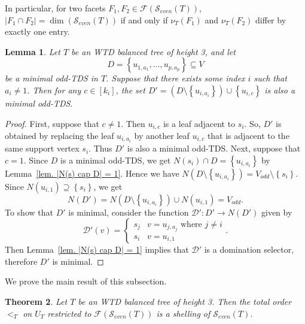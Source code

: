 \documentclass[12pt, reqno]{amsart}
\theoremstyle{definition}
\theoremstyle{plain}
\newtheorem{theorem}{Theorem}[subsection]
\newtheorem{lemma}[theorem]{Lemma}
\theoremstyle{definition}
\newcommand\set[1]{\left\lbrace #1 \right\rbrace}
\newcommand{\calS}{\mathcal{S}}
\newcommand{\calF}{\mathcal{F}}
\begin{document}
In particular, for two facets $F_1,F_2 \in \calF(\calS_{even}(T))$, $|F_1 \cap F_2| = \dim(\calS_{even}(T))$ if and only if $\nu_T(F_1)$ and $\nu_T(F_2)$ differ by exactly one entry.

\begin{lemma}\label{lem. non-zero to 1 is TDS}
    Let $T$ be an WTD balanced tree of height 3, and let 
    $$
    D = \set{u_{1,a_1},\dots,u_{p,a_p}} \subseteq V
    $$ 
    be a minimal odd-TDS in $T$.
    Suppose that there exists some index $i$ such that $a_i \neq 1$.
    Then for any $c \in [k_i]$, the set
    $D' = (D\setminus \set{u_{i,a_i}}) \cup \set{u_{i,c}}$
    is also a minimal odd-TDS.
\end{lemma}

\begin{proof}
    First, suppose that $c \neq 1$. 
    Then $u_{i,c}$ is a leaf adjacent to $s_i$.
    So, $D'$ is obtained by replacing the leaf $u_{i,a_i}$ by another leaf $u_{i,c}$ that is adjacent to the same support vertex $s_i$. 
    Thus $D'$ is also a minimal odd-TDS.
    Next, suppose that $c = 1$.
    Since $D$ is a minimal odd-TDS, we get $N(s_i) \cap D = \set{u_{i,a_i}}$ by Lemma~\ref{lem. |N(s) cap D| = 1}. 
    Hence we have $N(D\setminus \set{u_{i,a_i}}) = V_{odd}\setminus \set{s_i}$.
    Since $N(u_{i,1}) \supseteq \set{s_i}$, we get
    $$
    N(D') = N(D\setminus \set{u_{i,a_i}}) \cup N(u_{i,1}) = V_{odd}.
    $$ 
    To show that $D'$ is minimal, consider the function $\mathcal{D'}: D' \to N(D')$ given by 
    $$
    \mathcal{D'}(v) = \begin{cases}
        s_j & v = u_{j,a_j} \text{ where } j \neq i\\
        s_i & v = u_{i,1}
    \end{cases}.
    $$
    Then Lemma~\ref{lem. |N(s) cap D| = 1} implies that $\mathcal{D'}$ is a domination selector, therefore $D'$ is minimal.
\end{proof} 

We prove the main result of this subsection.

\begin{theorem}\label{thm. even stable complex is shellable}
    Let $T$ be an WTD balanced tree of height 3.
    Then the total order $<_T$ on $U_T$ restricted to $\mathcal{F}(\calS_{even}(T))$ is a shelling of $\calS_{even}(T)$.
\end{theorem}
\end{document}
